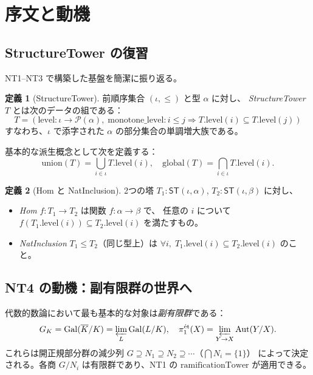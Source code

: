 \documentclass[a4paper,11pt]{ltjsarticle}
\theoremstyle{definition}
\newtheorem{definition}{定義}[section]
\theoremstyle{plain}
\theoremstyle{remark}
\newcommand{\ST}{\mathsf{ST}}
\newcommand{\Gal}{\mathrm{Gal}}
\newcommand{\lims}{\varprojlim}
\newcommand{\pione}{\pi_1^{\mathrm{\acute{e}t}}}
\begin{document}
\tableofcontents
\newpage

\section{序文と動機}
\label{sec:intro}

\subsection{StructureTower の復習}

NT1--NT3 で構築した基盤を簡潔に振り返る。

\begin{definition}[StructureTower]
\label{def:st}
前順序集合 $(\iota, \leq)$ と型 $\alpha$ に対し、
\emph{StructureTower} $T$ とは次のデータの組である：
\[
  T = (\mathrm{level} : \iota \to \mathcal{P}(\alpha),\;
       \text{monotone\_level} : i \leq j \Rightarrow T.\mathrm{level}(i) \subseteq T.\mathrm{level}(j))
\]
すなわち、$\iota$ で添字された $\alpha$ の部分集合の単調増大族である。
\end{definition}

基本的な派生概念として次を定義する：
\[
  \mathrm{union}(T) = \bigcup_{i \in \iota} T.\mathrm{level}(i), \quad
  \mathrm{global}(T) = \bigcap_{i \in \iota} T.\mathrm{level}(i).
\]

\begin{definition}[Hom と NatInclusion]
2つの塔 $T_1 : \ST(\iota, \alpha)$, $T_2 : \ST(\iota, \beta)$ に対し、
\begin{itemize}
  \item \emph{Hom} $f : T_1 \to T_2$ は関数 $f : \alpha \to \beta$ で、
    任意の $i$ について $f(T_1.\mathrm{level}(i)) \subseteq T_2.\mathrm{level}(i)$ を満たすもの。
  \item \emph{NatInclusion} $T_1 \leq T_2$（同じ型上）は
    $\forall i,\; T_1.\mathrm{level}(i) \subseteq T_2.\mathrm{level}(i)$ のこと。
\end{itemize}
\end{definition}

\subsection{NT4 の動機：副有限群の世界へ}

代数的数論において最も基本的な対象は\emph{副有限群}である：
\[
  G_K = \Gal(\overline{K}/K) = \lims_L \Gal(L/K),
  \quad
  \pione(X) = \lims_{Y \to X} \mathrm{Aut}(Y/X).
\]
これらは開正規部分群の減少列 $G \supseteq N_1 \supseteq N_2 \supseteq \cdots$（$\bigcap N_i = \{1\}$）
によって決定される。各商 $G/N_i$ は有限群であり、NT1 の \(\mathrm{ramificationTower}\) が適用できる。
\end{document}
